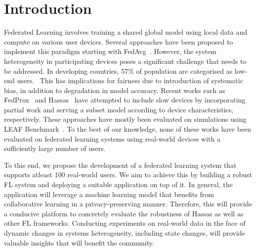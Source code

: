 \section{Introduction}
    Federated Learning involves training a shared global model using local data and compute on various user devices.
    Several approaches have been proposed to implement this paradigm starting with FedAvg~\cite{DBLP:journals/corr/McMahanMRA16}.
    However, the system heterogeneity in participating devices poses a significant challenge that needs to be addressed. In developing countries, 57\% of population are categorised as low-end users.~\cite{10.1145/3446382.3448652}
    This has implications for fairness due to introduction of systematic bias, in addition to degradation in model accuracy.
    Recent works such as FedProx~\cite{DBLP:journals/corr/abs-1812-06127} and Hassas~\cite{DBLP:journals/corr/abs-2110-14205} have attempted to include slow devices by incorporating partial work and serving a subset model according to device characteristics, respectively. 
    These approaches have mostly been evaluated on simulations using LEAF Benchmark~\cite{DBLP:journals/corr/abs-1812-01097}.
    To the best of our knowledge, none of these works have been evaluated on federated learning systems using real-world devices with a sufficiently large number of users. \newline

    To this end, we propose the development of a federated learning system that supports atleast 100 real-world users. We aim to achieve this by building a robust FL system and deploying a suitable application on top of it. In general, the application will leverage a machine learning model that benefits from collaborative learning in a privacy-preserving manner. Therefore, this will provide a conducive platform to concretely evaluate the robustness of Hassas as well as other FL frameworks. Conducting experiments on real-world data in the face of dynamic changes in systems heterogeneity, including state changes, will provide valuable insights that will benefit the community.